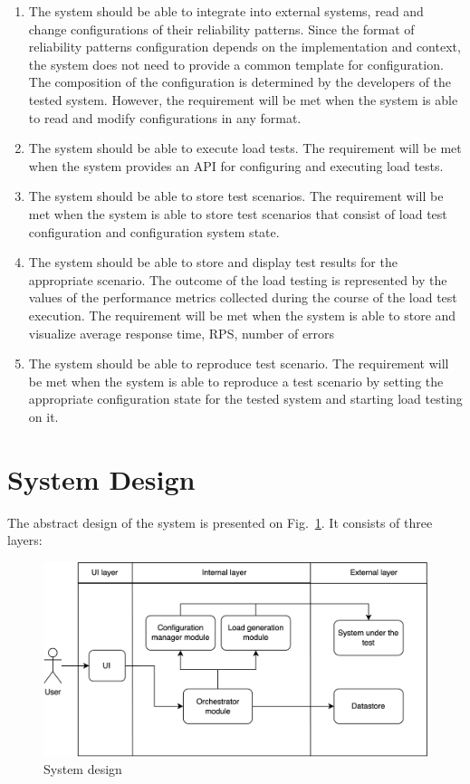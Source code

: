 \begin{enumerate}
    \item\label{subsec:fr:integrate} The system should be able to integrate into external systems, read and change configurations of their reliability patterns. Since the format of reliability patterns configuration depends on the implementation and context, the system does not need to provide a common template for configuration. The composition of the configuration is determined by the developers of the tested system. However, the requirement will be met when the system is able to read and modify configurations in any format.
    \item\label{subsec:fr:execute_load_test} The system should be able to execute load tests. The requirement will be met when the system provides an API for configuring and executing load tests.
    \item\label{subsec:fr:store_scenarios} The system should be able to store test scenarios. The requirement will be met when the system is able to store test scenarios that consist of load test configuration and configuration system state.
    \item\label{subsec:fr:store_results} The system should be able to store and display test results for the appropriate scenario. The outcome of the load testing is represented by the values of the performance metrics collected during the course of the load test execution. The requirement will be met when the system is able to store and visualize average response time, RPS, number of errors
    \item\label{subsec:fr:reproduce} The system should be able to reproduce test scenario. The requirement will be met when the system is able to reproduce a test scenario by setting the appropriate configuration state for the tested system and starting load testing on it.
\end{enumerate}

\section{System Design}\label{sec:system_design}
The abstract design of the system is presented on Fig.~\ref{fig:design}. It consists of three layers:

\begin{figure}[t]
    \centering
    \includegraphics[height=\textheight,width=\textwidth,keepaspectratio]{design.png}
    \caption{System design}
    \label{fig:design}
\end{figure}

